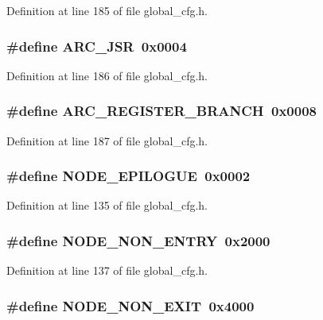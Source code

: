 Definition at line 185 of file global\_\-cfg.h.
\subsubsection{\setlength{\rightskip}{0pt plus 5cm}\#define ARC\_\-JSR~0x0004}\label{global__cfg_8h_49abba0ef804111e5dc14f3f2f064444}




Definition at line 186 of file global\_\-cfg.h.
\subsubsection{\setlength{\rightskip}{0pt plus 5cm}\#define ARC\_\-REGISTER\_\-BRANCH~0x0008}\label{global__cfg_8h_ce12874797197070ea0d4d08de39643f}




Definition at line 187 of file global\_\-cfg.h.
\subsubsection{\setlength{\rightskip}{0pt plus 5cm}\#define NODE\_\-EPILOGUE~0x0002}\label{global__cfg_8h_a231f6e8acf4df42d1218f3c76b9e3e3}




Definition at line 135 of file global\_\-cfg.h.
\subsubsection{\setlength{\rightskip}{0pt plus 5cm}\#define NODE\_\-NON\_\-ENTRY~0x2000}\label{global__cfg_8h_3eaeb3d663eada150a3be5a80e269649}




Definition at line 137 of file global\_\-cfg.h.
\subsubsection{\setlength{\rightskip}{0pt plus 5cm}\#define NODE\_\-NON\_\-EXIT~0x4000}\label{global__cfg_8h_532ad2782a84af877a709f2fd7716aa4}




